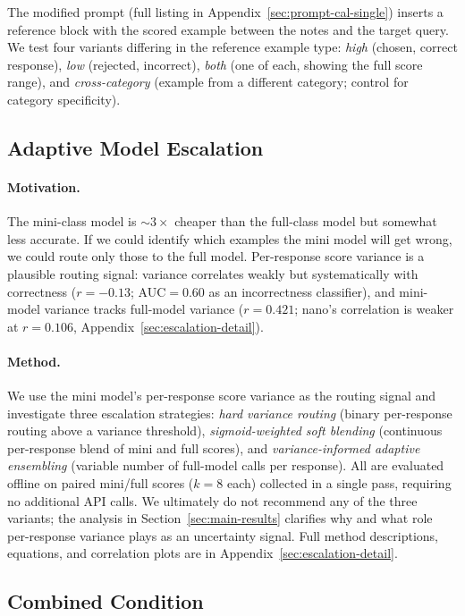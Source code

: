 \documentclass{article}
\begin{document}
The modified prompt (full listing in Appendix~\ref{sec:prompt-cal-single}) inserts a reference block with the scored example between the notes and the target query. We test four variants differing in the reference example type: \emph{high} (chosen, correct response), \emph{low} (rejected, incorrect), \emph{both} (one of each, showing the full score range), and \emph{cross-category} (example from a different category; control for category specificity).

\subsection{Adaptive Model Escalation}
\label{sec:escalation}

\paragraph{Motivation.} The mini-class model is ${\sim}3\times$ cheaper than the full-class model but somewhat less accurate. If we could identify which examples the mini model will get wrong, we could route only those to the full model. Per-response score variance is a plausible routing signal: variance correlates weakly but systematically with correctness ($r{=}{-}0.13$; AUC${=}0.60$ as an incorrectness classifier), and mini-model variance tracks full-model variance ($r{=}0.421$; nano's correlation is weaker at $r{=}0.106$, Appendix~\ref{sec:escalation-detail}).

\paragraph{Method.} We use the mini model's per-response score variance as the routing signal and investigate three escalation strategies: \emph{hard variance routing} (binary per-response routing above a variance threshold), \emph{sigmoid-weighted soft blending} (continuous per-response blend of mini and full scores), and \emph{variance-informed adaptive ensembling} (variable number of full-model calls per response). All are evaluated offline on paired mini/full scores ($k{=}8$ each) collected in a single pass, requiring no additional API calls. We ultimately do not recommend any of the three variants; the analysis in Section~\ref{sec:main-results} clarifies why and what role per-response variance plays as an uncertainty signal. Full method descriptions, equations, and correlation plots are in Appendix~\ref{sec:escalation-detail}.

\subsection{Combined Condition}
\label{sec:combined}
\end{document}
